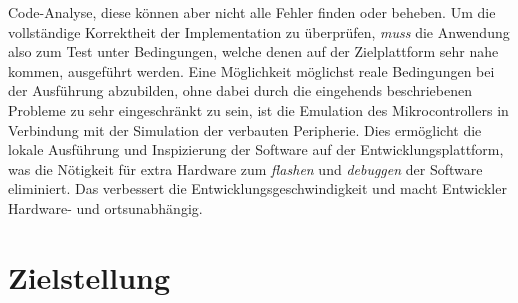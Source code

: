 Code-Analyse, diese können aber nicht alle Fehler finden oder beheben. 
Um die vollständige Korrektheit der Implementation zu überprüfen,
\textit{muss} die Anwendung also zum Test unter Bedingungen, welche denen auf
der Zielplattform sehr nahe kommen, ausgeführt werden.\newline
Eine Möglichkeit möglichst reale Bedingungen bei der Ausführung abzubilden,
ohne dabei durch die eingehends beschriebenen Probleme zu sehr eingeschränkt zu
sein, ist die Emulation des Mikrocontrollers in Verbindung mit der Simulation
der verbauten Peripherie.
Dies ermöglicht die lokale Ausführung und Inspizierung der Software auf der
Entwicklungsplattform, was die Nötigkeit für extra Hardware zum
\textit{flashen} und \textit{debuggen} der Software eliminiert.
Das verbessert die Entwicklungsgeschwindigkeit und macht Entwickler Hardware-
und ortsunabhängig.

\section{Zielstellung}

